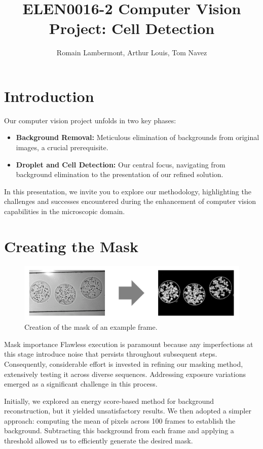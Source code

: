 \documentclass[12pt]{beamer}
\title{ELEN0016-2 Computer Vision Project: Cell Detection}
\author{Romain Lambermont, Arthur Louis, Tom Navez}
\begin{document}
\begin{frame}[t]
\begin{multicols}{3}

\section{Introduction}
Our computer vision project unfolds in two key phases:

\begin{itemize}
  \item \textbf{Background Removal:} Meticulous elimination of backgrounds from original images, a crucial prerequisite.
  \item \textbf{Droplet and Cell Detection:} Our central focus, navigating from background elimination to the presentation of our refined solution.
\end{itemize}

In this presentation, we invite you to explore our methodology, highlighting the challenges and successes encountered during the enhancement of computer vision capabilities in the microscopic domain. 

\section{Creating the Mask}
    \begin{figure}[H]
        \centering
        \includegraphics[width=.9\linewidth]{figs/section1.png}
        \caption{Creation of the mask of an example frame.}
        \label{fig:mask}
    \end{figure}

\begin{block}{Mask importance}
 Flawless execution is paramount because any imperfections at this stage introduce noise that persists throughout subsequent steps. Consequently, considerable effort is invested in refining our masking method, extensively testing it across diverse sequences. Addressing exposure variations emerged as a significant challenge in this process.
\end{block}
Initially, we explored an energy score-based method for background reconstruction, but it yielded unsatisfactory results. We then adopted a simpler approach: computing the mean of pixels across 100 frames to establish the background. Subtracting this background from each frame and applying a threshold allowed us to efficiently generate the desired mask.


\end{multicols}
\end{frame}
\end{document}
